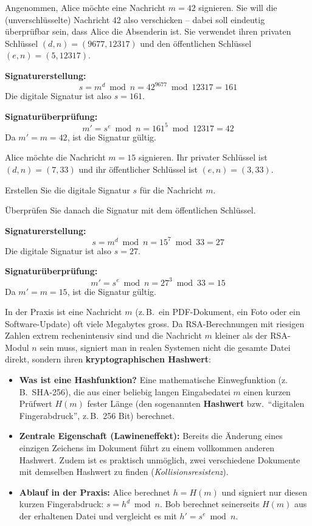 \begin{myexample}
	Angenommen, Alice möchte eine Nachricht $m = 42$ signieren. Sie will die (unverschlüsselte) Nachricht 42 also verschicken -- dabei soll eindeutig überprüfbar sein, dass Alice die Absenderin ist. Sie verwendet ihren privaten Schlüssel $(d, n) = (9677, 12317)$ und den öffentlichen Schlüssel $(e, n) = (5, 12317)$.

	\textbf{Signaturerstellung:}
	\[
		s = m^d \bmod n = 42^{9677} \bmod 12317 = 161
	\]
	Die digitale Signatur ist also $s = 161$.

	\textbf{Signaturüberprüfung:}
	\[
		m' = s^e \bmod n = 161^5 \bmod 12317 = 42
	\]
	Da $m' = m = 42$, ist die Signatur gültig.
\end{myexample}

\begin{myexercise}
	Alice möchte die Nachricht $m = 15$ signieren. Ihr privater Schlüssel ist $(d, n) = (7, 33)$ und ihr öffentlicher Schlüssel ist $(e, n) = (3, 33)$.

	Erstellen Sie die digitale Signatur $s$ für die Nachricht $m$.

	Überprüfen Sie danach die Signatur mit dem öffentlichen Schlüssel.
	\begin{myanswer}
		\textbf{Signaturerstellung:}
		\[
			s = m^d \bmod n = 15^7 \bmod 33 = 27
		\]
		Die digitale Signatur ist also $s = 27$.

		\textbf{Signaturüberprüfung:}
		\[
			m' = s^e \bmod n = 27^3 \bmod 33 = 15
		\]
		Da $m' = m = 15$, ist die Signatur gültig.
	\end{myanswer}
\end{myexercise}

\begin{myremark}
	In der Praxis ist eine Nachricht $m$ (z.\,B.\ ein \acrshort{PDF}-Dokument, ein Foto oder ein Software-Update) oft viele Megabytes gross. Da \gls{RSA}-Berechnungen mit riesigen Zahlen extrem rechenintensiv sind und die Nachricht $m$ kleiner als der \gls{RSA}-Modul $n$ sein muss, signiert man in realen Systemen nicht die gesamte Datei direkt, sondern ihren \textbf{kryptographischen Hashwert}:
	\begin{itemize}
		\item \textbf{Was ist eine Hashfunktion?} Eine mathematische Einwegfunktion (z.\,B.\ \acrshort{SHA}-256), die aus einer beliebig langen Eingabedatei $m$ einen kurzen Prüfwert $H(m)$ fester Länge (den sogenannten \textbf{Hashwert} bzw.\ \enquote{digitalen Fingerabdruck}, z.\,B.\ 256 Bit) berechnet.
		\item \textbf{Zentrale Eigenschaft (Lawineneffekt):} Bereits die Änderung eines einzigen Zeichens im Dokument führt zu einem vollkommen anderen Hashwert. Zudem ist es praktisch unmöglich, zwei verschiedene Dokumente mit demselben Hashwert zu finden (\emph{Kollisionsresistenz}).
		\item \textbf{Ablauf in der Praxis:} Alice berechnet $h = H(m)$ und signiert nur diesen kurzen Fingerabdruck: $s = h^d \bmod n$. Bob berechnet seinerseits $H(m)$ aus der erhaltenen Datei und vergleicht es mit $h' = s^e \bmod n$.
	\end{itemize}
\end{myremark}

